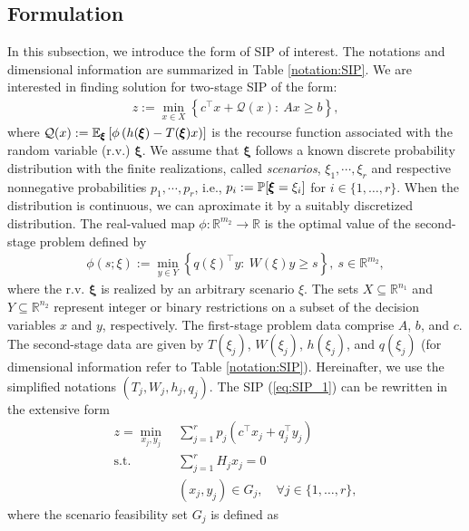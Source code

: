 \subsection{Formulation}
In this subsection, we introduce the form of SIP of interest. The notations and dimensional information are summarized in Table \ref{notation:SIP}. We are interested in finding solution for two-stage SIP of the form: 
\begin{align}
z:=\min_{x\in X}{\left\{c^\top x + \mathcal{Q}(x):\ Ax\ge b\right\}}, \label{eq:SIP_1}
\end{align}
where $\mathcal{Q}(x):=\operatorname*{\mathbb{E}}_{\pmb{\xi}}\left[ \phi\left( h(\pmb{\xi})-T(\pmb{\xi})x \right) \right]$ is the recourse function associated with the random variable (r.v.) $\pmb{\xi}$. We assume that $\pmb{\xi}$ follows a known discrete probability distribution with the finite realizations, called \textit{scenarios}, $\xi_1,\cdots,\xi_r$ and respective nonnegative probabilities $p_1,\cdots,p_r$, i.e., $p_i:=\operatorname*{\mathbb{P}}[\pmb{\xi}=\xi_i]$ for $i\in\{1,\ldots,r\}$. When the distribution is continuous, we can aproximate it by a suitably discretized distribution. The real-valued map $\phi:\mathbb{R}^{m_2}\to\mathbb{R}$ is the optimal value of the second-stage problem defined by
\begin{align}
\phi(s;\xi):=\min_{y\in Y}\left\{ q(\xi)^\top y:\ W(\xi)y \ge s \right\},\ s\in\mathbb{R}^{m_2},
\end{align}
where the r.v. $\pmb{\xi}$ is realized by an arbitrary scenario $\xi$.
The sets $X\subseteq \mathbb{R}^{n_1}$ and $Y\subseteq\mathbb{R}^{n_2}$ represent integer or binary restrictions on a subset of the decision variables $x$ and $y$, respectively. 
The first-stage problem data comprise $A$, $b$, and $c$. The second-stage data are given by $T(\xi_j)$, $W(\xi_j)$, $h(\xi_j)$, and $q(\xi_j)$ (for dimensional information refer to Table \ref{notation:SIP}). Hereinafter, we use the simplified notations $(T_j,W_j,h_j,q_j)$.
The SIP (\ref{eq:SIP_1}) can be rewritten in the extensive form
\begin{subequations}
\begin{align}
z=\min_{x_j,y_j}\ &\sum_{j=1}^{r}p_j\left(c^{\top}x_j+q_j^{\top}y_j\right)	\label{eq:SIP_2-1}\\ 
\mathrm{s.t.}\ &\sum_{j=1}^{r}H_j x_j=0 \label{eq:SIP_2-2} \\
\ &(x_j,y_j)\in G_j,\quad \forall j\in\{1,\ldots,r\},	\label{eq:SIP_2-3}
\end{align}
\end{subequations}
where the scenario feasibility set $G_j$ is defined as
